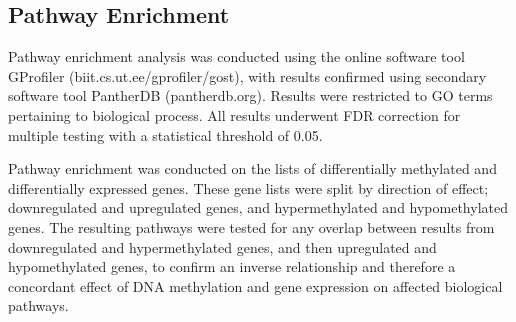 \documentclass{bioinfo}
\begin{document}
\begin{methods}

\subsection{Pathway Enrichment}
Pathway enrichment analysis was conducted using the online software tool GProfiler \citep{raudvere_gprofiler_2019} (biit.cs.ut.ee/gprofiler/gost), with results confirmed using secondary software tool PantherDB \citep{thomas_panther_2003} (pantherdb.org). Results were restricted to GO terms pertaining to biological process. All results underwent FDR correction for multiple testing with a statistical threshold of 0.05.

Pathway enrichment was conducted on the lists of differentially methylated and differentially expressed genes. These gene lists were split by direction of effect; downregulated and upregulated genes, and hypermethylated and hypomethylated genes. The resulting pathways were tested for any overlap between results from downregulated and hypermethylated genes, and then upregulated and hypomethylated genes, to confirm an inverse relationship and therefore a concordant effect of DNA methylation and gene expression on affected biological pathways.


\end{methods}
\end{document}
